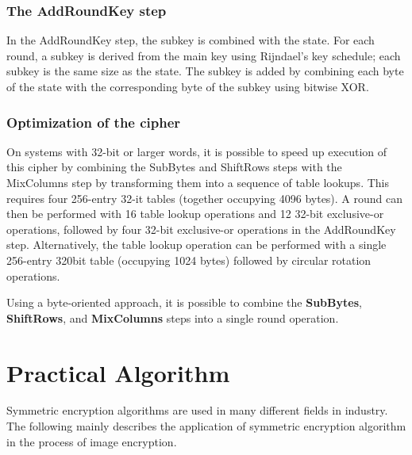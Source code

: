 \documentclass[11pt]{article}
\begin{document}
\subsubsection{The AddRoundKey step}

In the AddRoundKey step, the subkey is combined with the state. For each round, a subkey is derived from the main key using Rijndael's key schedule; each subkey is the same size as the state. The subkey is added by combining each byte of the state with the corresponding byte of the subkey using bitwise XOR.

\subsubsection{Optimization of the cipher}

On systems with 32-bit or larger words, it is possible to speed up execution of this cipher by combining the SubBytes and ShiftRows steps with the MixColumns step by transforming them into a sequence of table lookups. This requires four 256-entry 32-it tables (together occupying 4096 bytes). A round can then be performed with 16 table lookup operations and 12 32-bit exclusive-or operations, followed by four 32-bit exclusive-or operations in the AddRoundKey step. Alternatively, the table lookup operation can be performed with a single 256-entry 320bit table (occupying 1024 bytes) followed by circular rotation operations.

Using a byte-oriented approach, it is possible to combine the \textbf{SubBytes}, \textbf{ShiftRows}, and \textbf{MixColumns} steps into a single round operation.

\section{Practical Algorithm}
Symmetric encryption algorithms are used in many different fields in industry. The following mainly describes the application of symmetric encryption algorithm in the process of image encryption\citep{zeghid2007modified}.
\end{document}
